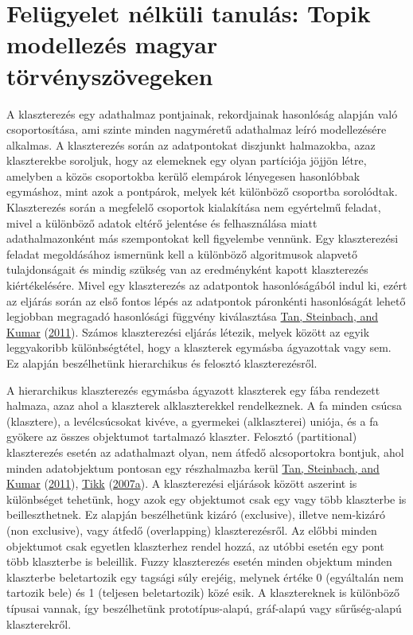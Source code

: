 \documentclass[
]{book}
\begin{document}
\hypertarget{feluxfcgyelet-nuxe9lkuxfcli-tanuluxe1s-topik-modellezuxe9s-magyar-tuxf6rvuxe9nyszuxf6vegeken}{%
\chapter{Felügyelet nélküli tanulás: Topik modellezés magyar
törvényszövegeken}\label{feluxfcgyelet-nuxe9lkuxfcli-tanuluxe1s-topik-modellezuxe9s-magyar-tuxf6rvuxe9nyszuxf6vegeken}}

A klaszterezés egy adathalmaz pontjainak, rekordjainak hasonlóság
alapján való csoportosítása, ami szinte minden nagyméretű adathalmaz
leíró modellezésére alkalmas. A klaszterezés során az adatpontokat
diszjunkt halmazokba, azaz klaszterekbe soroljuk, hogy az elemeknek egy
olyan partíciója jöjjön létre, amelyben a közös csoportokba kerülő
elempárok lényegesen hasonlóbbak egymáshoz, mint azok a pontpárok,
melyek két különböző csoportba sorolódtak. Klaszterezés során a
megfelelő csoportok kialakítása nem egyértelmű feladat, mivel a
különböző adatok eltérő jelentése és felhasználása miatt
adathalmazonként más szempontokat kell figyelembe vennünk. Egy
klaszterezési feladat megoldásához ismernünk kell a különböző
algoritmusok alapvető tulajdonságait és mindig szükség van az
eredményként kapott klaszterezés kiértékelésére. Mivel egy klaszterezés
az adatpontok hasonlóságából indul ki, ezért az eljárás során az első
fontos lépés az adatpontok páronkénti hasonlóságát lehető legjobban
megragadó hasonlósági függvény kiválasztása
\protect\hyperlink{ref-tan2011a}{Tan, Steinbach, and Kumar}
(\protect\hyperlink{ref-tan2011a}{2011}). Számos klaszterezési eljárás
létezik, melyek között az egyik leggyakoribb különbségtétel, hogy a
klaszterek egymásba ágyazottak vagy sem. Ez alapján beszélhetünk
hierarchikus és felosztó klaszterezésről.

A hierarchikus klaszterezés egymásba ágyazott klaszterek egy fába
rendezett halmaza, azaz ahol a klaszterek alklaszterekkel rendelkeznek.
A fa minden csúcsa (klasztere), a levélcsúcsokat kivéve, a gyermekei
(alklaszterei) uniója, és a fa gyökere az összes objektumot tartalmazó
klaszter. Felosztó (partitional) klaszterezés esetén az adathalmazt
olyan, nem átfedő alcsoportokra bontjuk, ahol minden adatobjektum
pontosan egy részhalmazba kerül \protect\hyperlink{ref-tan2011a}{Tan,
Steinbach, and Kumar} (\protect\hyperlink{ref-tan2011a}{2011}),
\protect\hyperlink{ref-tikk2007}{Tikk}
(\protect\hyperlink{ref-tikk2007}{2007a}). A klaszterezési eljárások
között aszerint is különbséget tehetünk, hogy azok egy objektumot csak
egy vagy több klaszterbe is beilleszthetnek. Ez alapján beszélhetünk
kizáró (exclusive), illetve nem-kizáró (non exclusive), vagy átfedő
(overlapping) klaszterezésről. Az előbbi minden objektumot csak egyetlen
klaszterhez rendel hozzá, az utóbbi esetén egy pont több klaszterbe is
beleillik. Fuzzy klaszterezés esetén minden objektum minden klaszterbe
beletartozik egy tagsági súly erejéig, melynek értéke 0 (egyáltalán nem
tartozik bele) és 1 (teljesen beletartozik) közé esik. A klasztereknek
is különböző típusai vannak, így beszélhetünk prototípus-alapú,
gráf-alapú vagy sűrűség-alapú klaszterekről.
\end{document}
